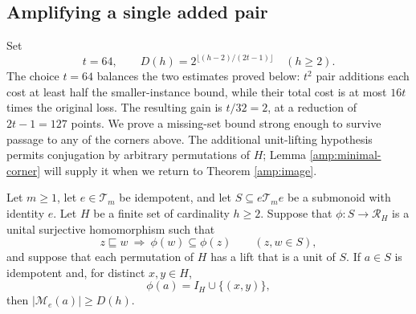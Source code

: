 \subsection{Amplifying a single added pair}

Set
\begin{equation}
 t=64,\qquad
 D(h)=2^{\lfloor(h-2)/(2t-1)\rfloor}\quad(h\geq2).
 \label{amp:D}
\end{equation}
The choice $t=64$ balances the two estimates proved below: $t^2$
pair additions each cost at least half the smaller-instance bound,
while their total cost is at most $16t$ times the original loss.
The resulting gain is $t/32=2$, at a reduction of $2t-1=127$ points.
We prove a missing-set bound strong enough to survive passage to
any of the corners above.  The additional unit-lifting hypothesis
permits conjugation by arbitrary permutations of $H$; Lemma
\ref{amp:minimal-corner} will supply it when we return to Theorem
\ref{amp:image}.

\begin{proposition}
\label{amp:single-edge}
Let $m\geq1$, let $e\in\mathcal T_m$ be idempotent, and let
$S\subseteq e\mathcal T_me$ be a submonoid with identity $e$.
Let $H$ be a finite set of cardinality $h\geq2$.  Suppose that
$\phi:S\to\mathcal R_H$ is a unital surjective homomorphism
such that
\[
 z\sqsubseteq w\ \Longrightarrow\ \phi(w)\subseteq\phi(z)
 \qquad(z,w\in S),
\]
and suppose that each permutation of $H$ has a lift that is a
unit of $S$.  If $a\in S$ is idempotent and, for distinct $x,y\in H$,
\[
 \phi(a)=I_H\cup\{(x,y)\},
\]
then $|\mathcal M_e(a)|\geq D(h)$.
\end{proposition}

